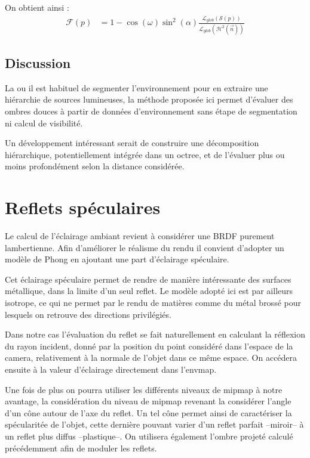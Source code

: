 \documentclass[10pt,a4paper,twoside, twocolumn]{report}
\begin{document}
On obtient ainsi :
\begin{align}
	\mathcal F(p)	&=	1 - \cos(\omega)\sin^2(\alpha)\frac{\mathcal L_{glob}(\mathcal{S}(p))}{\mathcal L_{glob}(\mathcal{H}^2(\vec{n}))}
\end{align}


\subsection{Discussion}

La ou il est habituel de segmenter l'environnement pour en extraire une hiérarchie de sources lumineuses, la méthode proposée ici permet d'évaluer des ombres douces à partir de données d'environnement sans étape de segmentation ni calcul de visibilité. 

Un développement intéressant serait de construire une décomposition hiérarchique, potentiellement intégrée dans un octree, et de l'évaluer plus ou moins profondément selon la distance considérée.



\section{Reflets spéculaires}

Le calcul de l'éclairage ambiant revient à considérer une BRDF purement lambertienne. Afin d'améliorer le réalisme du rendu il convient d'adopter un modèle de Phong en ajoutant une part d'éclairage spéculaire.

Cet éclairage spéculaire permet de rendre de manière intéressante des surfaces métallique, dans la limite d'un seul reflet. Le modèle adopté ici est par ailleurs isotrope, ce qui ne permet par le rendu de matières comme du métal brossé pour lesquels on retrouve des directions privilégiés.

Dans notre cas l'évaluation du reflet se fait naturellement en calculant la réflexion du rayon incident, donné par la position du point considéré dans l'espace de la camera, relativement à la normale de l'objet dans ce même espace. On accédera ensuite à la valeur d'éclairage directement dans l'envmap.

Une fois de plus on pourra utiliser les différents niveaux de mipmap à notre avantage, la considération du niveau de mipmap revenant la considérer l'angle d'un cône autour de l'axe du reflet. Un tel cône permet ainsi de caractériser la spécularitée de l'objet, cette dernière pouvant varier d'un reflet parfait --miroir-- à un reflet plus diffus --plastique--.
On utilisera également l'ombre projeté calculé précédemment afin de moduler les reflets.
\end{document}
